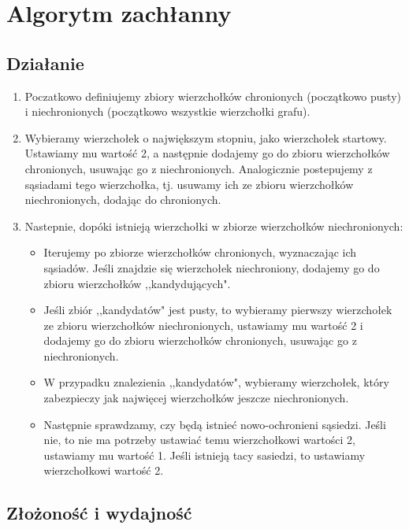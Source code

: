     \section{Algorytm zachłanny}
    \subsection{Działanie}
    
    \begin{enumerate}
        \item Poczatkowo definiujemy zbiory wierzchołków chronionych (początkowo pusty) i niechronionych (początkowo wszystkie wierzchołki grafu).
        \item Wybieramy wierzchołek o największym stopniu, jako wierzchołek startowy. Ustawiamy mu wartość 2, a następnie dodajemy go do zbioru wierzchołków chronionych, usuwając go z niechronionych. Analogicznie postepujemy z sąsiadami tego wierzchołka, tj. usuwamy ich ze zbioru wierzchołków niechronionych, dodając do chronionych. 
        \item Nastepnie, dopóki istnieją wierzchołki w zbiorze wierzchołków niechronionych:
        \begin{itemize}
            \item Iterujemy po zbiorze wierzchołków chronionych, wyznaczając ich sąsiadów. Jeśli znajdzie się wierzchołek niechroniony, dodajemy go do zbioru wierzchołków ,,kandydujących".
            \item Jeśli zbiór ,,kandydatów" jest pusty, to wybieramy pierwszy wierzchołek ze zbioru wierzchołków niechronionych, ustawiamy mu wartość 2 i dodajemy go do zbioru wierzchołków chronionych, usuwając go z niechronionych.
            \item W przypadku znalezienia ,,kandydatów", wybieramy wierzchołek, który zabezpieczy jak najwięcej wierzchołków jeszcze niechronionych.
            \item Następnie sprawdzamy, czy będą istnieć nowo-ochronieni sąsiedzi. Jeśli nie, to nie ma potrzeby ustawiać temu wierzchołkowi wartości 2, ustawiamy mu wartość 1. Jeśli istnieją tacy sasiedzi, to ustawiamy wierzchołkowi wartość 2. 
        \end{itemize}
    \end{enumerate}
    
    \subsection{Złożoność i wydajność}

